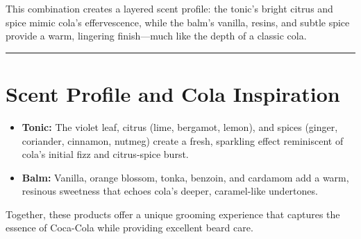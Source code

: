 \documentclass{article}
\begin{document}
This combination creates a layered scent profile: the tonic's bright citrus and spice mimic cola's effervescence, while the balm's vanilla, resins, and subtle spice provide a warm, lingering finish—much like the depth of a classic cola.

\vspace{1em}
\hrule
\vspace{1em}

\section*{Scent Profile and Cola Inspiration}

\begin{itemize}
\item \textbf{Tonic:} The violet leaf, citrus (lime, bergamot, lemon), and spices (ginger, coriander, cinnamon, nutmeg) create a fresh, sparkling effect reminiscent of cola's initial fizz and citrus-spice burst.

\item \textbf{Balm:} Vanilla, orange blossom, tonka, benzoin, and cardamom add a warm, resinous sweetness that echoes cola's deeper, caramel-like undertones.
\end{itemize}

Together, these products offer a unique grooming experience that captures the essence of Coca-Cola while providing excellent beard care.
\end{document}
